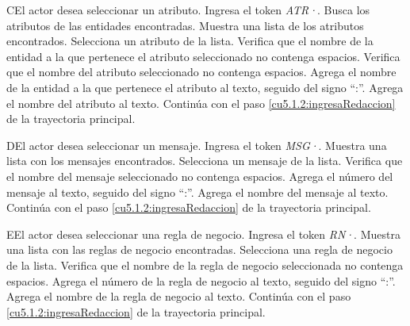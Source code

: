  \begin{UCtrayectoriaA}{C}{El actor desea seleccionar un atributo.}
 	\UCpaso[\UCactor] Ingresa el token {\it ATR·}.
  	\UCpaso[\UCsist] Busca los atributos de las entidades encontradas.
  	\UCpaso[\UCsist] Muestra una lista de los atributos encontrados.
 	\UCpaso[\UCactor] Selecciona un atributo de la lista.
  	\UCpaso[\UCsist] Verifica que el nombre de la entidad a la que pertenece el atributo seleccionado no contenga espacios. 
  	\UCpaso[\UCsist] Verifica que el nombre del atributo seleccionado no contenga espacios. 
  	\UCpaso[\UCsist] Agrega el nombre de la entidad a la que pertenece el atributo al texto, seguido del signo ``:''.
  	\UCpaso[\UCsist] Agrega el nombre del atributo al texto.
    \UCpaso[] Continúa con el paso \ref{cu5.1.2:ingresaRedaccion} de la trayectoria principal.
 \end{UCtrayectoriaA}
 \begin{UCtrayectoriaA}{D}{El actor desea seleccionar un mensaje.}
 	 \UCpaso[\UCactor] Ingresa el token {\it MSG·}.	
 	\UCpaso[\UCsist] Muestra una lista con los mensajes encontrados.
 	\UCpaso[\UCactor] Selecciona un mensaje de la lista.
  	\UCpaso[\UCsist] Verifica que el nombre del mensaje seleccionado no contenga espacios. 
  	\UCpaso[\UCsist] Agrega el número del mensaje al texto, seguido del signo ``:''.
  	\UCpaso[\UCsist] Agrega el nombre del mensaje al texto.
    \UCpaso[] Continúa con el paso \ref{cu5.1.2:ingresaRedaccion} de la trayectoria principal.
 \end{UCtrayectoriaA}
 \begin{UCtrayectoriaA}{E}{El actor desea seleccionar una regla de negocio.}
 	\UCpaso[\UCactor] Ingresa el token {\it RN·}.	
 	\UCpaso[\UCsist] Muestra una lista con las reglas de negocio encontradas.
 	\UCpaso[\UCactor] Selecciona una regla de negocio de la lista.
  	\UCpaso[\UCsist] Verifica que el nombre de la regla de negocio seleccionada no contenga espacios. 
  	\UCpaso[\UCsist] Agrega el número de la regla de negocio al texto, seguido del signo ``:''.
  	\UCpaso[\UCsist] Agrega el nombre de la regla de negocio al texto.
    \UCpaso[] Continúa con el paso \ref{cu5.1.2:ingresaRedaccion} de la trayectoria principal.
 \end{UCtrayectoriaA}
